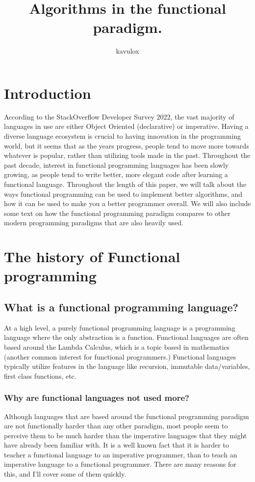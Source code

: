 \documentclass{report}
\title{Algorithms in the functional paradigm.}
\author{kavulox}
\begin{document}
\maketitle


\tableofcontents



\chapter{Introduction}

According to the StackOverflow Developer Survey 2022, the vast majority of languages in use are either Object Oriented (declarative) or imperative. Having a diverse language ecosystem is crucial to having innovation in the programming world, but it seems that as the years progress, people tend to move more towards whatever is popular, rather than utilizing tools made in the past.
Throughout the past decade, interest in functional programming languages has been slowly growing, as people tend to write better, more elegant code after learning a functional language.
Throughout the length of this paper, we will talk about the ways functional programming can be used to implement better algorithms, and how it can be used to make you a better programmer overall. We will also include some text on how the functional programming paradigm compares to other modern programming paradigms that are also heavily used.

\chapter{The history of Functional programming}
\section{What is a functional programming language?}
At a high level, a purely functional programming language is a programming language where the only abstraction is a function. Functional languages are often based around the Lambda Calculus, which is a topic based in mathematics (another common interest for functional programmers.) 
Functional languages typically utilize features in the language like recursion, immutable data/variables, first class functions, etc.
\subsection{Why are functional languages not used more?}
Although languages that are based around the functional programming paradigm are not functionally harder than any other paradigm, most people seem to perceive them to be much harder than the imperative languages that they might have already been familiar with.
It is a well known fact that it is harder to teacher a functional language to an imperative programmer, than to teach an imperative language to a functional programmer. There are many reasons for this, and I'll cover some of them quickly.
\end{document}
